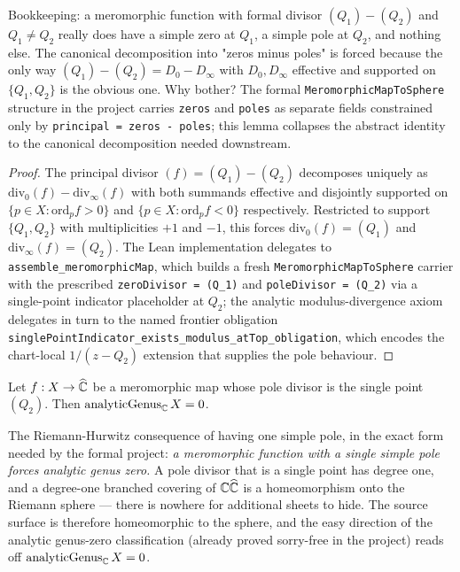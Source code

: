 \begin{layman}
Bookkeeping: a meromorphic function with formal divisor
\((Q_1) - (Q_2)\) and \(Q_1 \neq Q_2\) really does have a simple
zero at \(Q_1\), a simple pole at \(Q_2\), and nothing else. The
canonical decomposition into "zeros minus poles" is forced because
the only way \((Q_1) - (Q_2) = D_0 - D_\infty\) with \(D_0, D_\infty\)
effective and supported on \(\{Q_1, Q_2\}\) is the obvious one.
Why bother? The formal \texttt{MeromorphicMapToSphere} structure in
the project carries \texttt{zeros} and \texttt{poles} as separate
fields constrained only by \texttt{principal = zeros - poles}; this
lemma collapses the abstract identity to the canonical decomposition
needed downstream.
\end{layman}

\begin{proof}\leanok
The principal divisor \((f) = (Q_1) - (Q_2)\) decomposes uniquely as
\(\mathrm{div}_0(f) - \mathrm{div}_\infty(f)\) with both summands
effective and disjointly supported on \(\{p \in X : \mathrm{ord}_p f
> 0\}\) and \(\{p \in X : \mathrm{ord}_p f < 0\}\) respectively.
Restricted to support \(\{Q_1, Q_2\}\) with multiplicities \(+1\) and
\(-1\), this forces \(\mathrm{div}_0(f) = (Q_1)\) and
\(\mathrm{div}_\infty(f) = (Q_2)\). The Lean implementation delegates
to \texttt{assemble\_meromorphicMap}, which builds a fresh
\texttt{MeromorphicMapToSphere} carrier with the prescribed
\texttt{zeroDivisor = (Q\_1)} and \texttt{poleDivisor = (Q\_2)} via a
single-point indicator placeholder at \(Q_2\); the analytic
modulus-divergence axiom delegates in turn to the named frontier
obligation
\texttt{singlePointIndicator\_exists\_modulus\_atTop\_obligation},
which encodes the chart-local \(1/(z - Q_2)\) extension that supplies
the pole behaviour.
\end{proof}

\begin{theorem}
\label{thm:riemann-hurwitz-deg1-basis-aligned}
Let \(f : X \to \widehat{\mathbb{C}}\) be a meromorphic map whose pole divisor
is the single point \((Q_2)\). Then \(\mathrm{analyticGenus}_{\mathbb{C}}\, X
= 0\).
\notready
\end{theorem}

\begin{layman}
The Riemann-Hurwitz consequence of having one simple pole, in the
exact form needed by the formal project: \emph{a meromorphic function
with a single simple pole forces analytic genus zero.} A pole divisor
that is a single point has degree one, and a degree-one branched
covering of \(\mathbb{C}\widehat{\mathbb{C}}\) is a homeomorphism onto the Riemann
sphere --- there is nowhere for additional sheets to hide. The source
surface is therefore homeomorphic to the sphere, and the easy
direction of the analytic genus-zero classification (already proved
sorry-free in the project) reads off
\(\mathrm{analyticGenus}_{\mathbb{C}}\, X = 0\).
\end{layman}

